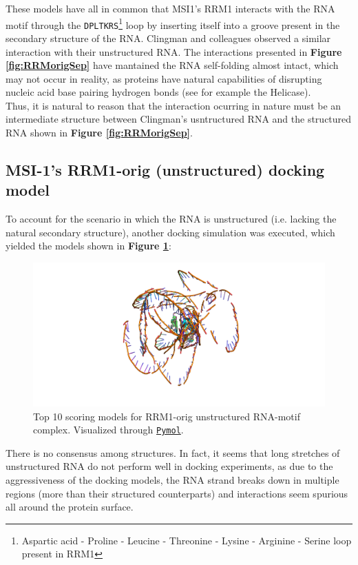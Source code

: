 These models have all in common that MSI1's RRM1 interacts with the RNA motif through the \texttt{DPLTKRS}\footnote{Aspartic acid - Proline - Leucine - Threonine - Lysine - Arginine - Serine loop present in RRM1} loop by inserting itself into a groove present in the secondary structure of the RNA. Clingman and colleagues \cite{clingman_2014} observed a similar interaction with their unstructured RNA. The interactions presented in \textbf{Figure \ref{fig:RRMorigSep}} have mantained the RNA self-folding almost intact, which may not occur in reality, as proteins have natural capabilities of disrupting nucleic acid base pairing hydrogen bonds (see for example the Helicase).\\

Thus, it is natural to reason that the interaction ocurring in nature must be an intermediate structure between Clingman's usntructured RNA and the structured RNA shown in \textbf{Figure \ref{fig:RRMorigSep}}.

\subsection{MSI-1's RRM1-orig (unstructured) docking model}

To account for the scenario in which the RNA is unstructured (i.e. lacking the natural secondary structure), another docking simulation was executed, which yielded the models shown in \textbf{Figure \ref{fig:linearOrigRRM1}}:

\begin{figure}[htbp!]
    \centering
    \includegraphics[width=0.82\linewidth]{assets/RMM1_linearOrig.png}
    \caption[Top 10 scoring models for RRM1-orig unstructured RNA-motif complex.]{Top 10 scoring models for RRM1-orig unstructured RNA-motif complex. Visualized through \href{https://pymol.org/2/}{\texttt{Pymol}}.}
    \label{fig:linearOrigRRM1}
\end{figure}

There is no consensus among structures. In fact, it seems that long stretches of unstructured RNA do not perform well in docking experiments, as due to the aggressiveness of the docking models, the RNA strand breaks down in multiple regions (more than their structured counterparts) and interactions seem spurious all around the protein surface.\\

